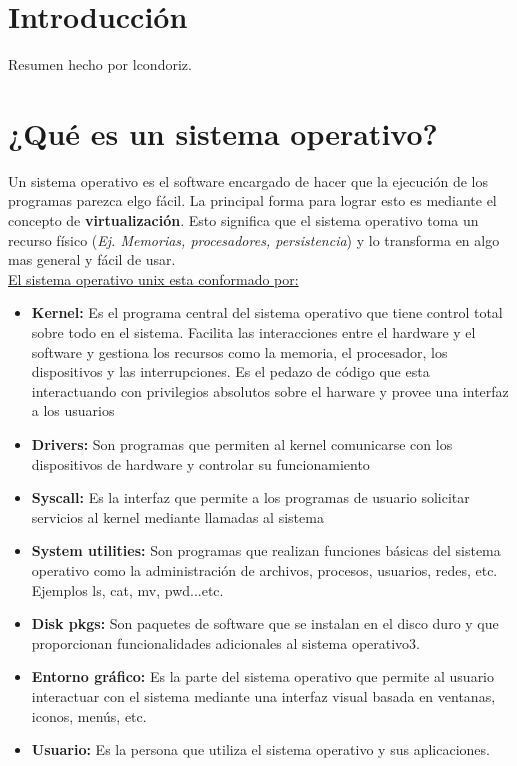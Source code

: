 \documentclass[../main.tex]{subfiles}
\begin{document}
    \section{Introducción} 
        Resumen hecho por lcondoriz.

    \section{¿Qué es un sistema operativo?}
        Un sistema operativo es el software encargado de hacer que la ejecución de los programas parezca elgo fácil. La principal forma para lograr esto es mediante el concepto de \textbf{virtualización}. Esto significa que el sistema operativo toma un recurso físico (\textit{Ej. Memorias, procesadores, persistencia}) y lo transforma en algo mas general y fácil de usar.\\

        \underline{El sistema operativo unix esta conformado por:}
        \begin{itemize}
            \item \textbf{Kernel:}
                Es el programa central del sistema operativo que tiene control total sobre todo en el sistema. Facilita las interacciones entre el hardware y el software y gestiona los recursos como la memoria, el procesador, los dispositivos y las interrupciones. Es el pedazo de código que esta interactuando con privilegios absolutos sobre el harware y provee una interfaz a los usuarios
            \item \textbf{Drivers:} 
                Son programas que permiten al kernel comunicarse con los dispositivos de hardware y controlar su funcionamiento

            \item \textbf{Syscall:}
                Es la interfaz que permite a los programas de usuario solicitar servicios al kernel mediante llamadas al sistema
            \item \textbf{System utilities:}
                Son programas que realizan funciones básicas del sistema operativo como la administración de archivos, procesos, usuarios, redes, etc. Ejemplos ls, cat, mv, pwd...etc.
            \item \textbf{Disk pkgs:}
                Son paquetes de software que se instalan en el disco duro y que proporcionan funcionalidades adicionales al sistema operativo3.
            \item \textbf{Entorno gráfico:}
                Es la parte del sistema operativo que permite al usuario interactuar con el sistema mediante una interfaz visual basada en ventanas, iconos, menús, etc.
            \item \textbf{Usuario:}
                Es la persona que utiliza el sistema operativo y sus aplicaciones.
        \end{itemize}
\end{document}

